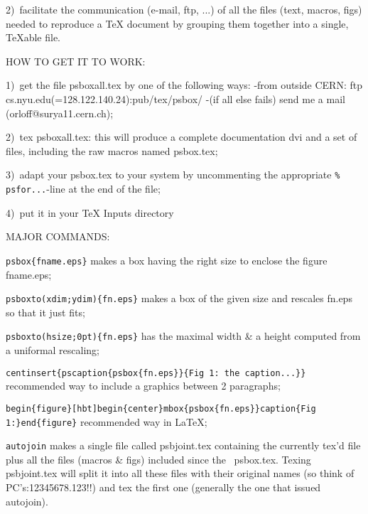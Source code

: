 {{{{{{{{{{{{{{{{{\item{2)\ }facilitate the communication (e-mail, ftp, ...) of all the files
   (text, macros, figs) needed to reproduce a TeX document by grouping
   them together into a single, TeXable file.

\bigskip
\noindent HOW TO GET IT TO WORK:
\item{1)\ }get the file psboxall.tex by one of the following ways:\nl
   -from outside CERN: ftp cs.nyu.edu(=128.122.140.24):pub/tex/psbox/\nl
   -(if all else fails) send me a mail (orloff@surya11.cern.ch);
\item{2)\ }tex psboxall.tex: this will produce a complete documentation
dvi and a
   set of files, including the raw macros named psbox.tex;
\item{3)\ }adapt your psbox.tex to your system by uncommenting the appropriate
   {\tt\%\\psfor...}-line at the end of the file;
\item{4)\ }put it in your TeX Inputs directory
}

\bigskip
MAJOR COMMANDS:

\def\tag#1{\noindent\hbox{\tt #1\hss}\nl{}}
\tag{\\psbox\{fname.eps\}}
   makes a box having the right size to enclose the figure fname.eps;

\tag{\\psboxto(xdim;ydim)\{fn.eps\}}
   makes a box of the given size and rescales fn.eps so that it just fits;

\tag{\\psboxto(\\hsize;0pt)\{fn.eps\}}
   has the maximal width \& a height computed from a uniformal rescaling;

\tag{\\centinsert\{\\pscaption\{\\psbox\{fn.eps\}\}\{Fig 1: the
caption...\}\}}
   recommended way to include a graphics between 2 paragraphs;

\tag{\\begin\{figure\}[hbt]\\begin\{center\}%
\\mbox\{\\psbox\{fn.eps\}\}\\caption\{Fig
1:\} \\end\{figure\}}
   recommended way in LaTeX;

\tag{\\autojoin}
   makes a single file called psbjoint.tex containing the currently tex'd
   file plus all the files (macros \& figs) included since the \
   psbox.tex. Texing psbjoint.tex will split it into all these files with
   their original names (so think of PC's:12345678.123!!) and tex the
   first one (generally the one that issued \\autojoin).

}}}}}}}}}}}}}}}}
